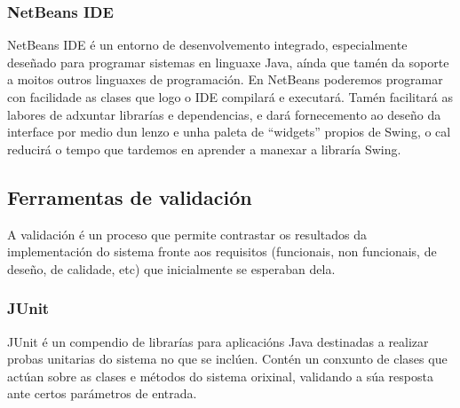 \subsubsection{NetBeans IDE}

NetBeans IDE é un entorno de desenvolvemento integrado, especialmente deseñado para programar sistemas en linguaxe Java, aínda que tamén da soporte a moitos outros linguaxes de programación. En NetBeans poderemos programar con facilidade as clases que logo o IDE compilará e executará. Tamén facilitará as labores de adxuntar librarías e dependencias, e dará fornecemento ao deseño da interface por medio dun lenzo e unha paleta de ``widgets'' propios de Swing, o cal reducirá o tempo que tardemos en aprender a manexar a libraría Swing.

\subsection{Ferramentas de validación}

A validación é un proceso que permite contrastar os resultados da implementación do sistema fronte aos requisitos (funcionais, non funcionais, de deseño, de calidade, etc) que inicialmente se esperaban dela.

\subsubsection{JUnit}

JUnit \cite{junit} é un compendio de librarías para aplicacións Java destinadas a realizar probas unitarias do sistema no que se inclúen. Contén un conxunto de clases que actúan sobre as clases e métodos do sistema orixinal, validando a súa resposta ante certos parámetros de entrada.